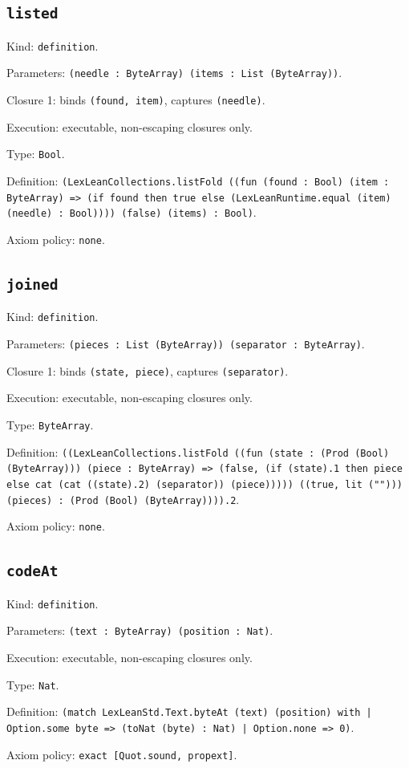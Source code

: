 \documentclass[11pt]{article}
\begin{document}
\subsection*{\texttt{listed}}
\noindent Kind: \texttt{definition}.\par
\noindent Parameters: \texttt{(needle : ByteArray) (items : List (ByteArray))}.\par
\noindent Closure 1: binds \texttt{(found, item)}, captures \texttt{(needle)}.\par
\noindent Execution: executable, non-escaping closures only.\par
\noindent Type: \texttt{Bool}.\par
\noindent Definition: \texttt{(LexLeanCollections.listFold ((fun (found : Bool) (item : ByteArray) => (if found then true else (LexLeanRuntime.equal (item) (needle) : Bool)))) (false) (items) : Bool)}.\par
\noindent Axiom policy: \texttt{none}.\par
\subsection*{\texttt{joined}}
\noindent Kind: \texttt{definition}.\par
\noindent Parameters: \texttt{(pieces : List (ByteArray)) (separator : ByteArray)}.\par
\noindent Closure 1: binds \texttt{(state, piece)}, captures \texttt{(separator)}.\par
\noindent Execution: executable, non-escaping closures only.\par
\noindent Type: \texttt{ByteArray}.\par
\noindent Definition: \texttt{((LexLeanCollections.listFold ((fun (state : (Prod (Bool) (ByteArray))) (piece : ByteArray) => (false, (if (state).1 then piece else cat (cat ((state).2) (separator)) (piece))))) ((true, lit (""))) (pieces) : (Prod (Bool) (ByteArray)))).2}.\par
\noindent Axiom policy: \texttt{none}.\par
\subsection*{\texttt{codeAt}}
\noindent Kind: \texttt{definition}.\par
\noindent Parameters: \texttt{(text : ByteArray) (position : Nat)}.\par
\noindent Execution: executable, non-escaping closures only.\par
\noindent Type: \texttt{Nat}.\par
\noindent Definition: \texttt{(match LexLeanStd.Text.byteAt (text) (position) with | Option.some byte => (toNat (byte) : Nat) | Option.none => 0)}.\par
\noindent Axiom policy: \texttt{exact [Quot.sound, propext]}.\par
\end{document}
